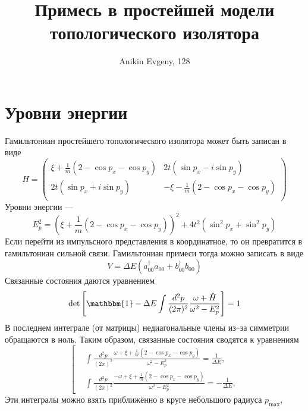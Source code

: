 \documentclass{article}
\title{Примесь в простейшей модели топологического изолятора}
\author{Anikin Evgeny, 128}
\begin{document}
\maketitle
\section{Уровни энергии}
Гамильтониан простейшего топологического изолятора может быть записан в виде
\begin{equation}
    H = \left(\begin{matrix}
            \xi + \frac{1}{m}(2 - \cos{p_x} - \cos{p_y}) & 2t(\sin{p_x} - i\sin{p_y})   \\
            2t(\sin{p_x} + i\sin{p_y}) & - \xi - \frac{1}{m}(2 - \cos{p_x} - \cos{p_y}) \\
        \end{matrix}\right)
\end{equation}
Уровни энергии ---
\begin{equation}
    E_p^2 = (\xi + \frac{1}{m}(2 - \cos{p_x} - \cos{p_y}))^2 + 4t^2(\sin^2{p_x} + \sin^2{p_y})
\end{equation}
Если перейти из импульсного представления в координатное, то он превратится в гамильтониан
сильной связи. Гамильтониан примеси тогда можно записать в виде
\begin{equation}
    V = \Delta E (a_{00}^\dagger a_{00} + b_{00}^\dagger b_{00})
\end{equation}
Связанные состояния даются уравнением
\begin{equation}    
    \det{\left[\mathbbm{1} - \Delta E \int \frac{d^2 p}{(2\pi)^2} 
            \frac{\omega + \hat{H}}{\omega^2 - E_p^2}\right]} = 1
\end{equation}
В последнем интеграле (от матрицы) недиагональные члены из--за симметрии обращаются в ноль.
Таким образом, связанные состояния сводятся к уравнениям
\begin{equation}
    \label{integrals}
    \left[
    \begin{split}
        &\int \frac{d^2 p}{(2\pi)^2} 
            \frac{\omega + \xi + \frac{1}{m}(2 - \cos{p_x} - \cos{p_y})}
                 {\omega^2 - E_p^2} = \frac{1}{\Delta E},\\
        &\int \frac{d^2 p}{(2\pi)^2} 
            \frac{-\omega + \xi + \frac{1}{m}(2 - \cos{p_x} - \cos{p_y})}
                 {\omega^2 - E_p^2} = -\frac{1}{\Delta E},
    \end{split}
    \right.
\end{equation}
Эти интегралы можно взять приближённо в круге небольшого радиуса $p_{\mathrm{max}}$,
\end{document}
